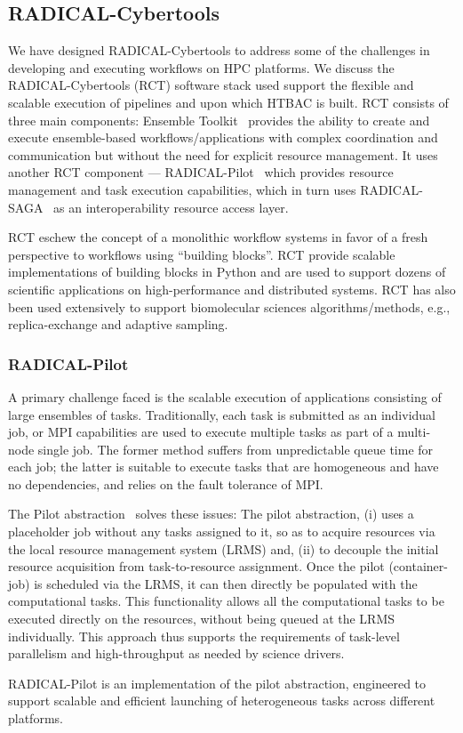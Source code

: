 \subsection{RADICAL-Cybertools}

We have designed RADICAL-Cybertools to address some of the challenges in
developing and executing workflows on HPC platforms. We discuss the 
RADICAL-Cybertools (RCT) software stack used support the flexible and scalable
execution of pipelines and upon which HTBAC is built. RCT consists of three
main components: Ensemble Toolkit~\cite{entk-icpp-2016} provides the ability
to create and execute ensemble-based workflows/applications with complex
coordination and communication but without the need for explicit resource
management. It uses another RCT component --- 
RADICAL-Pilot~\cite{review_radicalpilot} which provides resource management and task
execution capabilities, which in turn uses RADICAL-SAGA~\cite{saga-x ,ogf-
gfd-90} as an interoperability resource access layer.

RCT eschew the concept of a monolithic workflow systems in favor of a fresh
perspective to workflows using ``building blocks''. RCT provide scalable
implementations of building blocks in Python and are used to support dozens of
scientific applications on high-performance and distributed systems. RCT has
also been used extensively to support biomolecular sciences
algorithms/methods, e.g., replica-exchange and adaptive sampling.

\subsubsection{RADICAL-Pilot}\label{sec:pilot}

A primary challenge faced is the scalable execution of applications consisting
of large ensembles of tasks.  Traditionally, each task is submitted as an
individual job, or MPI capabilities are used to  execute multiple tasks as
part of a multi-node single job. The former method suffers from unpredictable
queue time for each job; the latter is suitable to execute tasks that are
homogeneous and have no dependencies, and relies on the fault tolerance of
MPI.

The Pilot abstraction~\cite{review_pilotreview} solves these issues:  The
pilot abstraction, (i) uses a placeholder job without any tasks assigned to
it, so as to acquire resources via the local resource management system (LRMS)
and, (ii) to decouple the initial resource acquisition from task-to-resource
assignment. Once the pilot (container-job) is scheduled via the LRMS, it can
then directly be populated with the computational tasks. This functionality
allows all the computational tasks to be executed directly on the resources,
without being queued at the LRMS individually. This approach thus supports the
requirements of task-level parallelism and high-throughput as needed by
science drivers.

RADICAL-Pilot is an implementation of the pilot abstraction, engineered to
support scalable and efficient launching of heterogeneous tasks across
different platforms.
